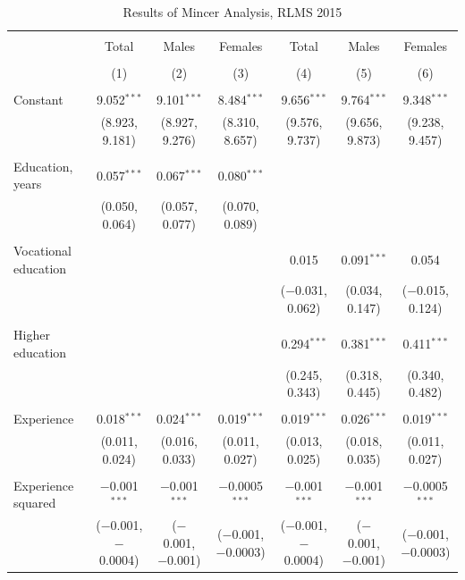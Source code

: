 \documentclass[alpha-refs]{wiley-article-01g}
\begin{document}
\begin{landscape}

\fontsize{9}{11}
\selectfont

\begin{table}[!htbp] \centering 
\renewcommand{\arraystretch}{1.0}
  \caption{Results of Mincer Analysis, RLMS 2015} 
  \label{} 
\begin{tabular}{@{\extracolsep{5pt}}lcccccc} 
\\[-1.8ex]\hline 
\hline \\[-1.8ex] 
 & Total & Males & Females & Total & Males & Females \\ 
\\[-1.8ex] & (1) & (2) & (3) & (4) & (5) & (6)\\ 
\hline \\[-1.8ex] 
 Constant & 9.052$^{***}$ & 9.101$^{***}$ & 8.484$^{***}$ & 9.656$^{***}$ & 9.764$^{***}$ & 9.348$^{***}$ \\ 
  & (8.923, 9.181) & (8.927, 9.276) & (8.310, 8.657) & (9.576, 9.737) & (9.656, 9.873) & (9.238, 9.457) \\ 
  & & & & & & \\ 
 Education, years & 0.057$^{***}$ & 0.067$^{***}$ & 0.080$^{***}$ &  &  &  \\ 
  & (0.050, 0.064) & (0.057, 0.077) & (0.070, 0.089) &  &  &  \\ 
  & & & & & & \\ 
 Vocational education &  &  &  & 0.015 & 0.091$^{***}$ & 0.054 \\ 
  &  &  &  & ($-$0.031, 0.062) & (0.034, 0.147) & ($-$0.015, 0.124) \\ 
  & & & & & & \\ 
 Higher education &  &  &  & 0.294$^{***}$ & 0.381$^{***}$ & 0.411$^{***}$ \\ 
  &  &  &  & (0.245, 0.343) & (0.318, 0.445) & (0.340, 0.482) \\ 
  & & & & & & \\ 
 Experience & 0.018$^{***}$ & 0.024$^{***}$ & 0.019$^{***}$ & 0.019$^{***}$ & 0.026$^{***}$ & 0.019$^{***}$ \\ 
  & (0.011, 0.024) & (0.016, 0.033) & (0.011, 0.027) & (0.013, 0.025) & (0.018, 0.035) & (0.011, 0.027) \\ 
  & & & & & & \\ 
 Experience squared & $-$0.001$^{***}$ & $-$0.001$^{***}$ & $-$0.0005$^{***}$ & $-$0.001$^{***}$ & $-$0.001$^{***}$ & $-$0.0005$^{***}$ \\ 
  & ($-$0.001, $-$0.0004) & ($-$0.001, $-$0.001) & ($-$0.001, $-$0.0003) & ($-$0.001, $-$0.0004) & ($-$0.001, $-$0.001) & ($-$0.001, $-$0.0003) \\ 

\end{tabular}
\end{table}
\end{landscape}
\end{document}
